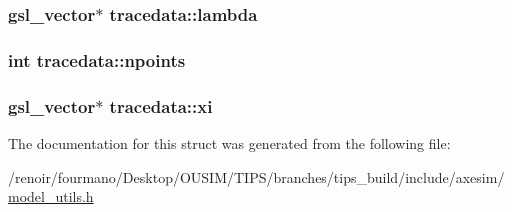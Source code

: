 \label{structtracedata_a263d2f1a51308e73d79c77f5e62c01fb}
\hypertarget{structtracedata_a3c594775ee8672308604497766a66f02}{
\subsubsection[{lambda}]{\setlength{\rightskip}{0pt plus 5cm}gsl\_\-vector$\ast$ {\bf tracedata::lambda}}}
\label{structtracedata_a3c594775ee8672308604497766a66f02}
\hypertarget{structtracedata_af5aed7b8f1629b86be33dc7d57056bcc}{
\subsubsection[{npoints}]{\setlength{\rightskip}{0pt plus 5cm}int {\bf tracedata::npoints}}}
\label{structtracedata_af5aed7b8f1629b86be33dc7d57056bcc}
\hypertarget{structtracedata_aee169f9a7859629a3f3b9e8a58c43a39}{
\subsubsection[{xi}]{\setlength{\rightskip}{0pt plus 5cm}gsl\_\-vector$\ast$ {\bf tracedata::xi}}}
\label{structtracedata_aee169f9a7859629a3f3b9e8a58c43a39}


The documentation for this struct was generated from the following file:\begin{DoxyCompactItemize}
\item 
/renoir/fourmano/Desktop/OUSIM/TIPS/branches/tips\_\-build/include/axesim/\hyperlink{model__utils_8h}{model\_\-utils.h}\end{DoxyCompactItemize}
